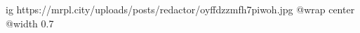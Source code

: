  
 
 
 
 

\ifcmt
  ig https://mrpl.city/uploads/posts/redactor/oyffdzzmfh7piwoh.jpg
  @wrap center
  @width 0.7
\fi
